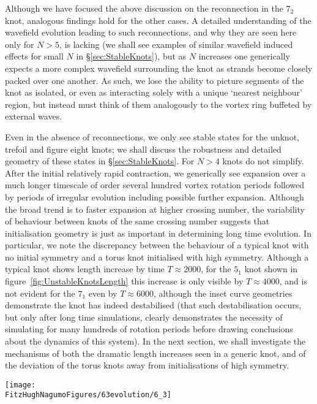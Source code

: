 Although we have focused the above discussion on the reconnection in the $7_2$ knot, analogous findings hold for the other cases. A detailed understanding of the wavefield evolution leading to such reconnections, and why they are seen here only for $N>5$, is lacking (we shall see examples of similar wavefield induced effects for small $N$ in \S \ref{sec:StableKnots}), but as $N$ increases one generically expects a more complex wavefield surrounding the knot as strands become closely packed over one another. As such, we lose the ability to picture segments of the knot as isolated, or even as interacting solely with a unique `nearest neighbour' region, but instead must think of them analogously to the vortex ring buffeted by external waves.

Even in the absence of reconnections, we only see stable states for the unknot, trefoil and figure eight knots; we shall discuss the robustness and detailed geometry of these states in \S \ref{sec:StableKnots}. For $N>4$ knots do not simplify. After the initial relatively rapid contraction, we generically see expansion over a much longer timescale of order several hundred vortex rotation periods followed by periods of irregular evolution including possible further expansion. Although the broad trend is to faster expansion at higher crossing number, the variability of behaviour between knots of the same crossing number suggests that initialisation geometry is just as important in determining long time evolution. In particular, we note the discrepancy between the behaviour of a typical knot with no initial symmetry and a torus knot initialised with high symmetry. Although a typical knot shows length increase by time $T\approx2000$, for the $5_1$ knot shown in figure~\ref{fig:UnstableKnotsLength} this increase is only visible by $T\approx4000$, and is not evident for the $7_1$ even by $T\approx6000$, although the inset curve geometries demonstrate the knot has indeed destabilised (that such destabilisation occurs, but only after long time simulations, clearly demonstrates the necessity of simulating for many hundreds of rotation periods before drawing conclusions about the dynamics of this system). In the next section, we shall investigate the mechanisms of both the dramatic length increases seen in a generic knot, and of the deviation of the torus knots away from initialisations of high symmetry. 
\begin{figure*}[htbp]
\centering
    \texttt{[image: \\FitzHughNagumoFigures/63evolution/6\_3]}
\end{figure*}
